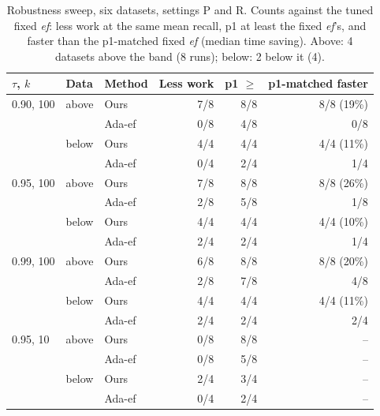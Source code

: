 \documentclass[sigconf,anonymous]{acmart}
\newcommand{\ef}{\textit{ef}}
\begin{document}
\begin{table}[t]
  \caption{Robustness sweep, six datasets, settings P and R. Counts against the tuned fixed \ef{}:
  less work at the same mean recall, p1 at least the fixed \ef{}'s, and faster than the p1-matched
  fixed \ef{} (median time saving). Above: 4 datasets above the band (8 runs); below: 2 below it (4).}
  \label{tab:sweep}
  \centering\footnotesize\setlength{\tabcolsep}{3.5pt}
  \begin{tabular}{lllrrr}
    \toprule
    $\tau$, $k$ & Data & Method & Less work & p1 $\geq$ & p1-matched faster \\
    \midrule
    0.90, 100 & above & Ours   & 7/8 & 8/8 & 8/8 (19\%) \\
              &       & Ada-ef & 0/8 & 4/8 & 0/8 \\
              & below & Ours   & 4/4 & 4/4 & 4/4 (11\%) \\
              &       & Ada-ef & 0/4 & 2/4 & 1/4 \\
    \midrule
    0.95, 100 & above & Ours   & 7/8 & 8/8 & 8/8 (26\%) \\
              &       & Ada-ef & 2/8 & 5/8 & 1/8 \\
              & below & Ours   & 4/4 & 4/4 & 4/4 (10\%) \\
              &       & Ada-ef & 2/4 & 2/4 & 1/4 \\
    \midrule
    0.99, 100 & above & Ours   & 6/8 & 8/8 & 8/8 (20\%) \\
              &       & Ada-ef & 2/8 & 7/8 & 4/8 \\
              & below & Ours   & 4/4 & 4/4 & 4/4 (11\%) \\
              &       & Ada-ef & 2/4 & 2/4 & 2/4 \\
    \midrule
    0.95, 10  & above & Ours   & 0/8 & 8/8 & -- \\
              &       & Ada-ef & 0/8 & 5/8 & -- \\
              & below & Ours   & 2/4 & 3/4 & -- \\
              &       & Ada-ef & 0/4 & 2/4 & -- \\
    \bottomrule
  \end{tabular}
\end{table}
\end{document}
